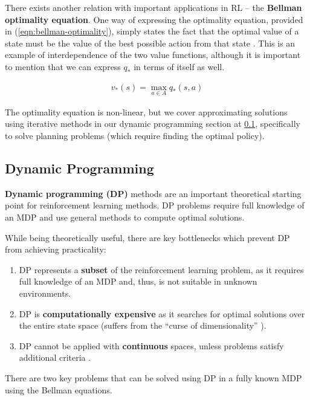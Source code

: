 There exists another relation with important applications in RL -- the \textbf{Bellman optimality equation}.
One way of expressing the optimality equation, provided in (\ref{eqn:bellman-optimality}), simply states the fact that the optimal value of a state must be the value of the best possible action from that state \cite{rlai}.
This is an example of interdependence of the two value functions, although it is important to mention that we can express $q_{*}$ in terms of itself as well.

\begin{equation} \label{eqn:bellman-optimality}
    \begin{aligned}
        v_*(s) = \max_{a \in A} q_{*}(s, a)
    \end{aligned}
\end{equation}

The optimality equation is non-linear, but we cover approximating solutions using iterative methods in our dynamic programming section at \ref{rl:dp}, specifically to solve planning problems (which require finding the optimal policy).

\subsection{Dynamic Programming} \label{rl:dp}
\textbf{Dynamic programming (DP)} methods are an important theoretical starting point for reinforcement learning methods. DP problems require full knowledge of an MDP and use general methods to compute optimal solutions.

While being theoretically useful, there are key bottlenecks which prevent DP from achieving practicality:

\begin{enumerate}
    \item DP represents a \textbf{subset} of the reinforcement learning problem, as it requires full knowledge of an MDP and, thus, is not suitable in unknown environments.
    \item DP is \textbf{computationally expensive} as it searches for optimal solutions over the entire state space (suffers from the ``curse of dimensionality'' \cite{rlai}).
    \item DP cannot be applied with \textbf{continuous} spaces, unless problems satisfy additional criteria \cite{rlai}.
\end{enumerate}

There are two key problems that can be solved using DP in a fully known MDP using the Bellman equations.

